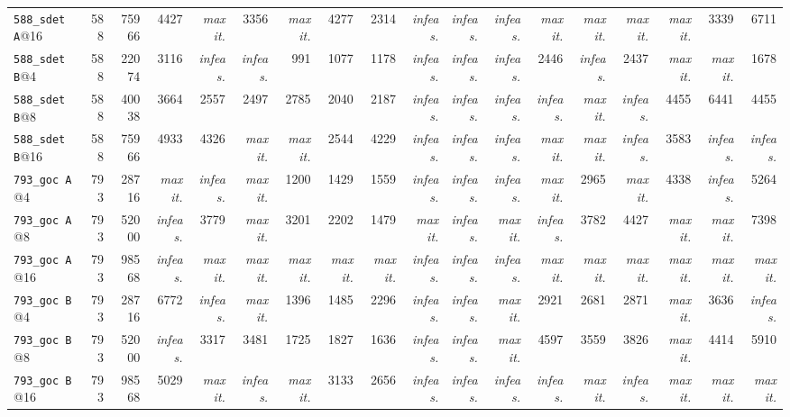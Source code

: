 {\begin{longtable}{lrrrrrrrrrrrrrrrrr}
\texttt{588\_sdet~A}@16 & 588 & 75966 & 4427 & \textit{max it.} & 3356 & \textit{max it.} & 4277 & 2314 & \textit{infeas.} & \textit{infeas.} & \textit{infeas.} & \textit{max it.} & \textit{max it.} & \textit{max it.} & \textit{max it.} & 3339 & 6711 \\
\texttt{588\_sdet~B}@4 & 588 & 22074 & 3116 & \textit{infeas.} & \textit{infeas.} & 991 & 1077 & 1178 & \textit{infeas.} & \textit{infeas.} & \textit{infeas.} & 2446 & \textit{infeas.} & 2437 & \textit{max it.} & \textit{max it.} & 1678 \\
\texttt{588\_sdet~B}@8 & 588 & 40038 & 3664 & 2557 & 2497 & 2785 & 2040 & 2187 & \textit{infeas.} & \textit{infeas.} & \textit{infeas.} & \textit{infeas.} & \textit{max it.} & \textit{infeas.} & 4455 & 6441 & 4455 \\
\texttt{588\_sdet~B}@16 & 588 & 75966 & 4933 & 4326 & \textit{max it.} & \textit{max it.} & 2544 & 4229 & \textit{infeas.} & \textit{infeas.} & \textit{infeas.} & \textit{max it.} & \textit{max it.} & \textit{infeas.} & 3583 & \textit{infeas.} & \textit{infeas.} \\
\texttt{793\_goc~A}@4 & 793 & 28716 & \textit{max it.} & \textit{infeas.} & \textit{max it.} & 1200 & 1429 & 1559 & \textit{infeas.} & \textit{infeas.} & \textit{infeas.} & \textit{max it.} & 2965 & \textit{max it.} & 4338 & \textit{infeas.} & 5264 \\
\texttt{793\_goc~A}@8 & 793 & 52000 & \textit{infeas.} & 3779 & \textit{max it.} & 3201 & 2202 & 1479 & \textit{max it.} & \textit{infeas.} & \textit{max it.} & \textit{infeas.} & 3782 & 4427 & \textit{max it.} & \textit{max it.} & 7398 \\
\texttt{793\_goc~A}@16 & 793 & 98568 & \textit{infeas.} & \textit{max it.} & \textit{max it.} & \textit{max it.} & \textit{max it.} & \textit{max it.} & \textit{infeas.} & \textit{infeas.} & \textit{infeas.} & \textit{max it.} & \textit{max it.} & \textit{max it.} & \textit{max it.} & \textit{max it.} & \textit{max it.} \\
\texttt{793\_goc~B}@4 & 793 & 28716 & 6772 & \textit{infeas.} & \textit{max it.} & 1396 & 1485 & 2296 & \textit{infeas.} & \textit{infeas.} & \textit{max it.} & 2921 & 2681 & 2871 & \textit{max it.} & 3636 & \textit{infeas.} \\
\texttt{793\_goc~B}@8 & 793 & 52000 & \textit{infeas.} & 3317 & 3481 & 1725 & 1827 & 1636 & \textit{infeas.} & \textit{infeas.} & \textit{max it.} & 4597 & 3559 & 3826 & \textit{max it.} & 4414 & 5910 \\
\texttt{793\_goc~B}@16 & 793 & 98568 & 5029 & \textit{max it.} & \textit{infeas.} & \textit{max it.} & 3133 & 2656 & \textit{infeas.} & \textit{infeas.} & \textit{infeas.} & \textit{infeas.} & \textit{max it.} & \textit{infeas.} & \textit{max it.} & \textit{max it.} & \textit{max it.} \\

\end{longtable}}
